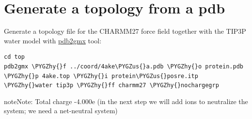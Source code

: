 \documentclass[letterpaper,10pt,english]{sphinxmanual}
\def\PYGZus{\char`\_}
\def\PYGZhy{\char`\-}
\begin{document}
\section{Generate a topology from a pdb}
\label{system_setup:generate-a-topology-from-a-pdb}
Generate a topology file for the CHARMM27 force field together with the
TIP3P water model with \href{http://manual.gromacs.org/current/online/pdb2gmx.html}{pdb2gmx} tool:

\begin{Verbatim}[commandchars=\\\{\}]
cd top
pdb2gmx \PYGZhy{}f ../coord/4ake\PYGZus{}a.pdb \PYGZhy{}o protein.pdb \PYGZhy{}p 4ake.top \PYGZhy{}i protein\PYGZus{}posre.itp \PYGZhy{}water tip3p \PYGZhy{}ff charmm27 \PYGZhy{}nochargegrp
\end{Verbatim}

\begin{notice}{note}{Note:}
Total charge -4.000e (in the next step we will add ions to
neutralize the system; we need a net-neutral system)
\end{notice}
\end{document}

